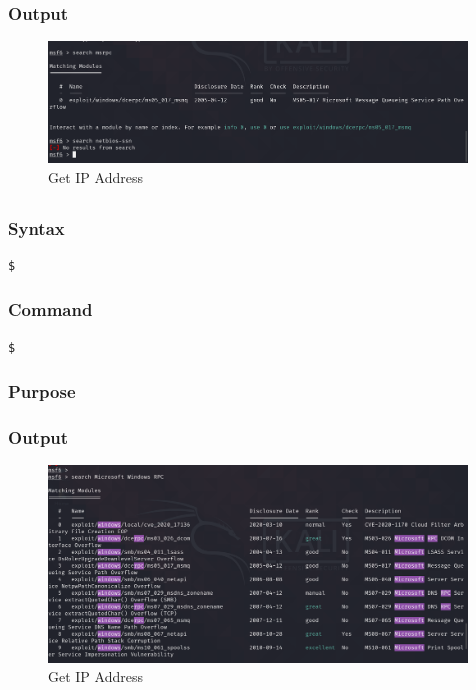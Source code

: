 \documentclass[11pt]{article}
\begin{document}
\subsubsection*{Output}
\begin{figure}[H]
    \centering
    \includegraphics[width=0.99\textwidth]{a3_ss (18).png}
    \caption{Get IP Address}
    \label{fig:1}
\end{figure}
\subsection{}

\subsubsection*{Syntax}
\begin{verbatim}
$
\end{verbatim}

\subsubsection*{Command}
\begin{verbatim}
$
\end{verbatim}

\subsubsection*{Purpose}

\subsubsection*{Output}
\begin{figure}[H]
    \centering
    \includegraphics[width=0.99\textwidth]{a3_ss (19).png}
    \caption{Get IP Address}
    \label{fig:1}
\end{figure}
\end{document}
